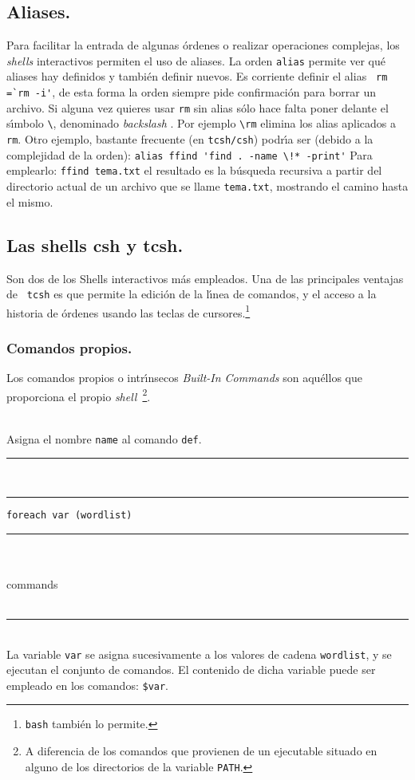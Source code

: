 \subsection{Aliases.}

Para facilitar la entrada de algunas {\'o}rdenes o realizar operaciones
complejas, los {\it shells} interactivos permiten el uso de 
aliases. La orden \verb+alias+ permite ver qu{\'e} aliases hay definidos
y tambi{\'e}n definir nuevos. Es corriente definir el alias 
\verb+ rm =`rm -i'+, de esta forma la orden siempre pide confirmaci{\'o}n para borrar
un archivo. Si alguna vez quieres usar \verb+rm+ sin alias s{\'o}lo hace
falta poner delante el s{\'\i}mbolo \verb+\+, denominado {\it backslash} .  Por
ejemplo \verb+\rm+ elimina los alias aplicados a \verb+rm+.  Otro
ejemplo, bastante frecuente (en \verb+tcsh/csh+) podr{\'\i}a ser (debido a la
complejidad de la orden): \verb+alias ffind 'find . -name \!* -print'+ 
Para emplearlo: \verb+ffind tema.txt+ el resultado es la
b{\'u}squeda recursiva a partir del directorio actual de un archivo que se
llame \verb+tema.txt+, mostrando el camino hasta el mismo.

\subsection{Las shells csh y tcsh.} 

Son dos de los Shells interactivos m{\'a}s empleados.  Una de las
principales ventajas de \verb+ tcsh+ es que permite la edici{\'o}n de la
l{\'\i}nea de comandos, y el acceso a la historia de {\'o}rdenes usando las
teclas de cursores.\footnote{{\tt bash} tambi{\'e}n lo permite.}


\subsubsection{Comandos propios.}

Los comandos propios o intr{\'\i}nsecos {\it Built-In Commands} son
aqu\'ellos que proporciona el propio {\it shell}\ \footnote{A diferencia
  de los comandos que provienen de un ejecutable situado en alguno de
  los directorios de la variable {\tt PATH}.}.

\vspace{.3cm}

\noindent
{}\\
Asigna el nombre \verb+name+ al comando \verb+def+. 

\vspace{.3cm}
\noindent
\rule{5.1cm}{.03cm}\\
\rule[-1.3cm]{0.03cm}{1.8cm}
{\tt foreach var (wordlist)}
\rule[-1.3cm]{0.03cm}{1.8cm}\\
\vspace{-1.25cm}\\
\phantom{aaaa}commands\\
\phantom{a}{\tt end}\\
\rule[.3cm]{5.1cm}{.03cm}\\
La variable \verb+var+ se asigna sucesivamente a los valores de cadena
\verb+wordlist+, y se ejecutan el conjunto de comandos. El contenido
de dicha variable puede ser empleado en los comandos: {\tt \$var}.

